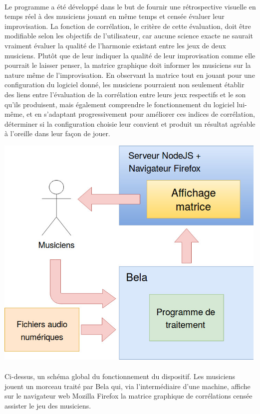 \paragraph{}
Le programme a été développé dans le but de fournir une rétrospective
visuelle en temps réel à des musiciens jouant en même temps et censée
évaluer leur improvisation. La fonction de corrélation, le critère de
cette évaluation, doit être modifiable selon les objectifs de
l'utilisateur, car aucune science exacte ne saurait vraiment évaluer
la qualité de l'harmonie existant entre les jeux de deux
musiciens. Plutôt que de leur indiquer la qualité de leur
improvisation comme elle pourrait le laisser penser, la matrice
graphique doit informer les musiciens sur la nature même de
l'improvisation. En observant la matrice tout en jouant pour une
configuration du logiciel donné, les musiciens pourraient non
seulement établir des liens entre l'évaluation de la corrélation entre
leurs jeux respectifs et le son qu'ils produisent, mais également
comprendre le fonctionnement du logiciel lui-même, et en s'adaptant
progressivement pour améliorer ces indices de corrélation, déterminer
si la configuration choisie leur convient et produit un résultat
agréable à l'oreille dans leur façon de jouer.

\includegraphics[scale=1]{schemaglobal.png}

\paragraph{}
Ci-dessus, un schéma global du fonctionnement du dispositif. Les
musiciens jouent un morceau traité par Bela qui, via l'intermédiaire
d'une machine, affiche sur le navigateur web Mozilla Firefox la
matrice graphique de corrélations censée assister le jeu des
musiciens.

